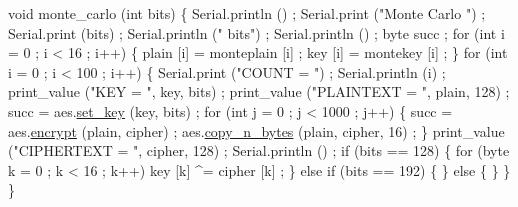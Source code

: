 \begin{DoxyCodeInclude}
\textcolor{keywordtype}{void} monte\_carlo (\textcolor{keywordtype}{int} bits)
\{
  Serial.println () ;
  Serial.print (\textcolor{stringliteral}{"Monte Carlo "}) ;
  Serial.print (bits) ;
  Serial.println (\textcolor{stringliteral}{" bits"}) ;
  Serial.println () ;
  byte succ ;
  \textcolor{keywordflow}{for} (\textcolor{keywordtype}{int} i = 0 ; i < 16 ; i++)
  \{
    plain [i] = monteplain [i] ;
    key [i] = montekey [i] ;
  \}
  \textcolor{keywordflow}{for} (\textcolor{keywordtype}{int} i = 0 ; i < 100 ; i++)
    \{
      Serial.print (\textcolor{stringliteral}{"COUNT = "}) ; Serial.println (i) ;
      print\_value (\textcolor{stringliteral}{"KEY = "}, key, bits) ;
      print\_value (\textcolor{stringliteral}{"PLAINTEXT = "}, plain, 128) ;
      succ = aes.\hyperlink{classAES_afe2900d46f475f6f3ea8d164e1581ed9}{set\_key} (key, bits) ;
      \textcolor{keywordflow}{for} (\textcolor{keywordtype}{int} j = 0 ; j < 1000 ; j++)
        \{
          succ = aes.\hyperlink{classAES_a72a674e99a92e296d1bf03444fe6ea15}{encrypt} (plain, cipher) ;
          aes.\hyperlink{classAES_ae7b28053b759aea46d13f2c8ebc3b64a}{copy\_n\_bytes} (plain, cipher, 16) ;
        \}
      print\_value (\textcolor{stringliteral}{"CIPHERTEXT = "}, cipher, 128) ;
      Serial.println () ;
      \textcolor{keywordflow}{if} (bits == 128)
        \{
          \textcolor{keywordflow}{for} (byte k = 0 ; k < 16 ; k++)
            key [k] ^= cipher [k] ;
        \}
      \textcolor{keywordflow}{else} \textcolor{keywordflow}{if} (bits == 192)
        \{
        \}
      \textcolor{keywordflow}{else}
        \{
        \}
    \}
\}
\end{DoxyCodeInclude}
 